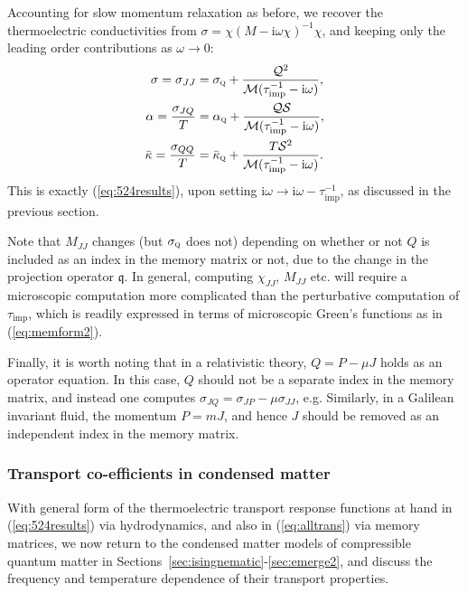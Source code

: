 \documentclass[10pt, oneside]{book}
\begin{document}
\begin{doublespace}
Accounting for slow momentum relaxation as before, we recover the thermoelectric conductivities from $\sigma = \chi (M-\mathrm{i}\omega \chi)^{-1}\chi$, and keeping only the leading order contributions as $\omega \rightarrow 0$: \begin{subequations}\begin{align}
\sigma = \sigma_{JJ} &= \sigma_{\textsc{q}} + \frac{\mathcal{Q}^2}{\mathcal{M}(\tau^{-1}_{\mathrm{imp}}-\mathrm{i}\omega)}, \\
\alpha = \frac{\sigma_{JQ}}{T} &= \alpha_{\textsc{q}} + \frac{\mathcal{QS}}{\mathcal{M}(\tau^{-1}_{\mathrm{imp}}-\mathrm{i}\omega)}, \\
\bar\kappa = \frac{\sigma_{QQ}}{T} &= \bar\kappa_{\textsc{q}} + \frac{T\mathcal{S}^2}{\mathcal{M}(\tau^{-1}_{\mathrm{imp}}-\mathrm{i}\omega)}.
\end{align} \label{eq:alltrans}
\end{subequations}
This is exactly (\ref{eq:524results}),  upon setting $\mathrm{i}\omega \rightarrow \mathrm{i}\omega - \tau^{-1}_{\mathrm{imp}}$, as discussed in the previous section.

Note that $M_{JJ}$ changes (but $\sigma_{\textsc{q}}$ does not) depending on whether or not $Q$ is included as an index in the memory matrix or not, due to the change in the projection operator $\mathfrak{q}$.     In general, computing $\chi_{JJ}$, $M_{JJ}$ etc. will require a microscopic computation more complicated than the perturbative computation of $\tau_{\mathrm{imp}}$, which is readily expressed in terms of microscopic Green's functions as in (\ref{eq:memform2}).

Finally, it is worth noting that in a relativistic theory,  $Q=P-\mu J$ 
holds as an operator equation.   In this case, $Q$ should not be a separate index in the memory matrix, and instead one computes $\sigma_{JQ} = \sigma_{JP} - \mu \sigma_{JJ}$, e.g.    Similarly, in a Galilean invariant fluid, the momentum $P = m J$,  and hence $J$ should be removed as an independent index in the memory matrix.

\subsubsection{Transport co-efficients in condensed matter}

With general form of the thermoelectric transport response functions at hand in (\ref{eq:524results}) via hydrodynamics, and also in 
(\ref{eq:alltrans}) via memory matrices, we now return to the condensed matter models of compressible quantum matter
in Sections~\ref{sec:isingnematic}-\ref{sec:emerge2}, and discuss the frequency and temperature dependence of their transport properties.


\end{doublespace}
\end{document}
